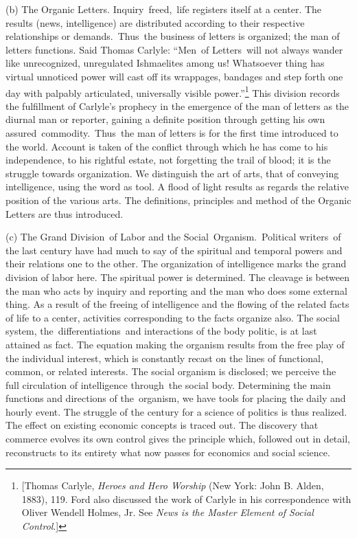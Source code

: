 \documentclass[twoside,symmetric,nobib,justified]{tufte-book}
\begin{document}
\begin{hangparas}{.25in}{1}
(b) The Organic Letters. Inquiry~freed,~life registers itself at a
center. The results (news, intelligence) are distributed according to
their respective relationships or demands.~Thus~the business of letters
is organized; the man of letters functions. Said Thomas Carlyle:
``Men~of Letters~will not always wander like unrecognized, unregulated
Ishmaelites among us! Whatsoever thing has virtual unnoticed power will
cast off its wrappages, bandages and step forth one day with palpably
articulated, universally visible power.''\footnote{{[}Thomas Carlyle,
  \emph{Heroes and Hero Worship} (New York: John B. Alden, 1883), 119.
  Ford also discussed the work of Carlyle in his correspondence with
  Oliver Wendell Holmes, Jr. See \emph{News is the Master Element of
  Social Control}.{]}} This division records the fulfillment of
Carlyle's prophecy in the emergence of the man of letters as the diurnal
man or reporter, gaining a definite position through getting his own
assured~commodity.~Thus~the man of letters is for the first time
introduced to the world. Account is taken of the conflict through which
he has come to his independence, to his rightful estate, not forgetting
the trail of blood; it is the struggle towards organization. We
distinguish the art of arts, that of conveying intelligence, using the
word as tool. A flood of light results as regards the relative position
of the various arts. The definitions, principles and method of the
Organic Letters are thus introduced.~

(c) The Grand Division~of Labor and the Social~Organism.~Political
writers~of the last century have had much to say of the spiritual and
temporal powers and their relations one to the other. The organization
of intelligence marks the grand division of labor here. The spiritual
power is determined. The cleavage is between the man who acts by inquiry
and reporting and the man who does some external thing. As a result of
the freeing of intelligence and the flowing of the related facts of life
to a center, activities corresponding to the facts organize also. The
social system, the~differentiations~and interactions of the body
politic, is at last attained as fact. The equation making the organism
results from the free play of the individual interest, which is
constantly recast on the lines of functional, common, or related
interests. The social organism is disclosed; we perceive the full
circulation of intelligence through~the social body. Determining the
main functions and directions of the~organism, we have tools for placing
the daily and hourly event. The struggle of the century for a science of
politics is thus realized. The effect on existing economic concepts is
traced out. The discovery that commerce evolves its own control gives
the principle which, followed out in detail, reconstructs to its
entirety what now passes for economics and social science. ~


\end{hangparas}
\end{document}
